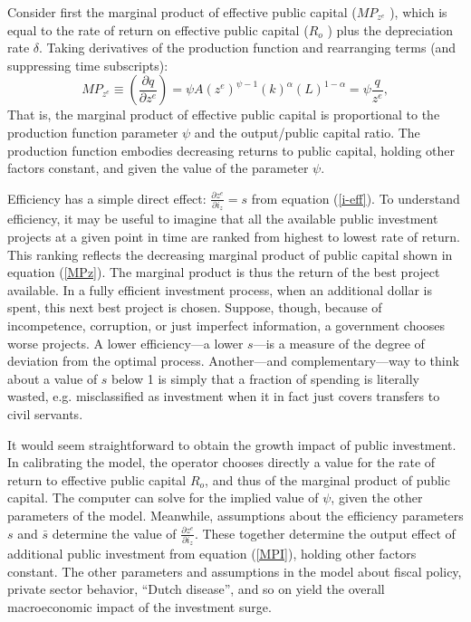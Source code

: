 \documentclass[11pt]{article}
\begin{document}
\begin{appendix}
Consider first the marginal product of effective public capital ($MP_{z^{e}}$%
), which is equal to the rate of return on effective public capital ($R_{o}$%
) plus the depreciation rate $\delta $. Taking derivatives of the production
function and rearranging terms (and suppressing time subscripts):%
\begin{equation}
MP_{z^{e}}\equiv \left( \frac{\partial q}{\partial z^{e}}\right) =\psi
A\left( z^{e}\right) ^{\psi -1}\left( k\right) ^{\alpha }\left( L\right)
^{1-\alpha }=\psi \frac{q}{z^{e}},  \label{MPz}
\end{equation}%
That is, the marginal product of effective public capital is proportional to
the production function parameter $\psi $ and the output/public capital
ratio. The production function embodies decreasing returns to public
capital, holding other factors constant, and given the value of the
parameter $\psi $.

Efficiency has a simple direct effect: $\frac{\partial z^{e}}{\partial i_{z}}%
=s$ from equation (\ref{i-eff}). To understand efficiency, it may be useful
to imagine that all the available public investment projects at a given
point in time are ranked from highest to lowest rate of return. This ranking
reflects the decreasing marginal product of public capital shown in equation
(\ref{MPz}). The marginal product is thus the return of the best project
available. In a fully efficient investment process, when an additional
dollar is spent, this next best project is chosen. Suppose, though, because
of incompetence, corruption, or just imperfect information, a government
chooses worse projects. A lower efficiency---a lower $s$---is a measure of
the degree of deviation from the optimal process. Another---and
complementary---way to think about a value of $s$ below 1 is simply that a
fraction of spending is literally wasted, e.g. misclassified as investment
when it in fact just covers transfers to civil servants.

It would seem straightforward to obtain the growth impact of public
investment. In calibrating the model, the operator chooses directly a value
for the rate of return to effective public capital $R_{o}$, and thus of the
marginal product of public capital. The computer can solve for the implied
value of $\psi $, given the other parameters of the model. Meanwhile,
assumptions about the efficiency parameters $s$ and $\bar{s}$ determine the
value of $\frac{\partial z^{e}}{\partial i_{z}}$. These together determine
the output effect of additional public investment from equation (\ref{MPI}),
holding other factors constant. The other parameters and assumptions in the
model about fiscal policy, private sector behavior, \textquotedblleft Dutch
disease\textquotedblright , and so on yield the overall macroeconomic impact
of the investment surge.


\end{appendix}
\end{document}
